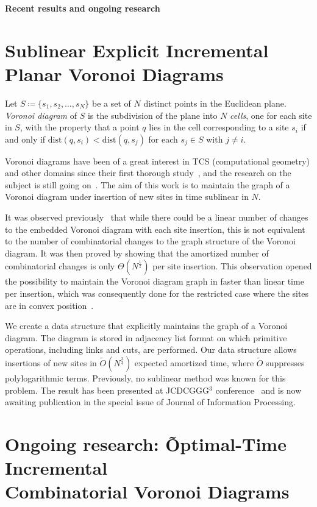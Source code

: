 \documentclass[a4paper,11pt]{article}
\def\vsection#1{\vspace{-4.5mm}\section{#1}\vspace{-3.5mm}}
\theoremstyle{definition}
\begin{document}
\def\P{\mathcal P} \def\Ot{\tilde O}

\begin{center}
	{\LARGE\bf Recent results and ongoing research}
\end{center} \vspace{-3.8mm}

\vsection{Sublinear Explicit Incremental Planar Voronoi Diagrams}

	Let $S \coloneqq \{s_1, s_2, \ldots, s_N\}$ be a set of $N$ distinct points in the Euclidean plane. \emph{Voronoi diagram} of $S$ is the subdivision of the plane into $N$ \emph{cells}, one for each site in $S$, with the property that a point $q$ lies in the cell corresponding to a site $s_i$ if and only if $\mathrm{dist} (q, s_i) < \mathrm{dist} (q, s_j)$ for each $s_j \in S$ with $j \ne i$.

Voronoi diagrams have been of a great interest in TCS (computational geometry) and other domains since their first thorough study~\cite{v-vd}, and the research on the subject is still going on~\cite{vd-new}. The aim of this work is to maintain the graph of a Voronoi diagram under insertion of new sites in time sublinear in $N$.

It was observed previously~\cite{incremental-vd} that while there could be a linear number of changes to the embedded Voronoi diagram with each site insertion, this is not equivalent to the number of combinatorial changes to the graph structure of the Voronoi diagram. It was then proved by showing that the amortized number of combinatorial changes is only $\Theta(N^{\frac 12})$ per site insertion. This observation opened the possibility to maintain the Voronoi diagram graph in faster than linear time per insertion, which was consequently done for the restricted case where the sites are in convex position~\cite{incremental-vd}.

We create a data structure that explicitly maintains the graph of a Voronoi diagram. The diagram is stored in adjacency list format on which primitive operations, including links and cuts, are performed. Our data structure allows insertions of new sites in $\Ot (N^{\frac 34})$ expected amortized time, where $\Ot$ suppresses polylogarithmic terms. Previously, no sublinear method was known for this problem. The result has been presented at JCDCGGG$^3$ conference~\cite{sevd} and is now awaiting publication in the special issue of Journal of Information Processing.

\vsection{Ongoing research: \~Optimal-Time Incremental \\
	Combinatorial Voronoi Diagrams}
\end{document}
